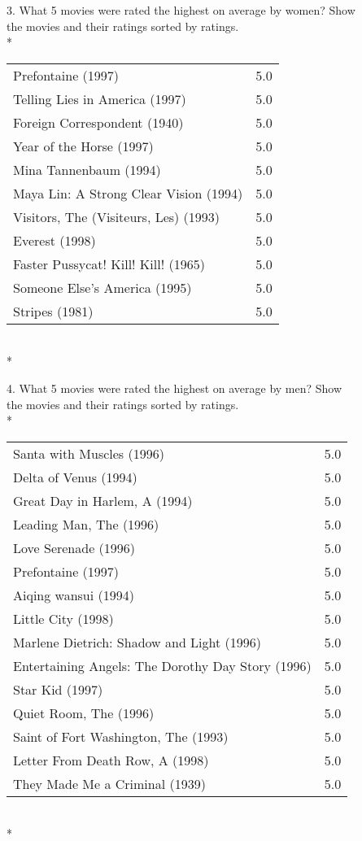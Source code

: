 \documentclass{article}
\begin{document}
3.  What 5 movies were rated the highest on average by women? Show\\
the movies and their ratings sorted by ratings.\\*
\begin{tabular}{ l r }
Prefontaine (1997)  & 5.0 \\
Telling Lies in America (1997)  & 5.0 \\
Foreign Correspondent (1940)  & 5.0 \\
Year of the Horse (1997)  & 5.0 \\
Mina Tannenbaum (1994)  & 5.0 \\
Maya Lin: A Strong Clear Vision (1994)  & 5.0 \\
Visitors, The (Visiteurs, Les) (1993)  & 5.0 \\
Everest (1998)  & 5.0 \\
Faster Pussycat! Kill! Kill! (1965)  & 5.0 \\
Someone Else's America (1995)  & 5.0 \\
Stripes (1981)  & 5.0 \\
\end{tabular}
\\*

4.  What 5 movies were rated the highest on average by men? Show\\
the movies and their ratings sorted by ratings.\\*
\begin{tabular}{ l r }
Santa with Muscles (1996)  & 5.0 \\
Delta of Venus (1994)  & 5.0 \\
Great Day in Harlem, A (1994)  & 5.0 \\
Leading Man, The (1996)  & 5.0 \\
Love Serenade (1996)  & 5.0 \\
Prefontaine (1997)  & 5.0 \\
Aiqing wansui (1994)  & 5.0 \\
Little City (1998)  & 5.0 \\
Marlene Dietrich: Shadow and Light (1996)   & 5.0 \\
Entertaining Angels: The Dorothy Day Story (1996)  & 5.0 \\
Star Kid (1997)  & 5.0 \\
Quiet Room, The (1996)  & 5.0 \\
Saint of Fort Washington, The (1993)  & 5.0 \\
Letter From Death Row, A (1998)  & 5.0 \\
They Made Me a Criminal (1939)  & 5.0 \\
\end{tabular}
\\*
\end{document}
